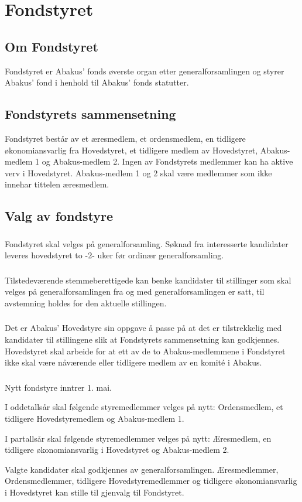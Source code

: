 \section{Fondstyret}
\subsection{Om Fondstyret}
Fondstyret er Abakus’ fonds øverste organ etter generalforsamlingen og styrer
Abakus’ fond i henhold til Abakus’ fonds statutter.

\subsection{Fondstyrets sammensetning}
Fondstyret består av et æresmedlem, et ordensmedlem, en tidligere økonomiansvarlig fra
Hovedstyret, et tidligere medlem av Hovedstyret, Abakus-medlem 1 og Abakus-medlem 2.
Ingen av Fondstyrets medlemmer kan ha aktive verv i Hovedstyret. Abakus-medlem 1 og 2 skal
være medlemmer som ikke innehar tittelen æresmedlem.

\subsection{Valg av fondstyre}
\subsubsection{}
Fondstyret skal velges på generalforsamling. Søknad fra interesserte kandidater
leveres hovedstyret to -2- uker før ordinær generalforsamling.

\subsubsection{}
Tilstedeværende stemmeberettigede kan benke kandidater til stillinger som skal velges
på generalforsamlingen fra og med generalforsamlingen er satt, til avstemning holdes for
den aktuelle stillingen.

\subsubsection{}
Det er Abakus’ Hovedstyre sin oppgave å passe på at det er tilstrekkelig med kandidater til
stillingene slik at Fondstyrets sammensetning kan godkjennes. Hovedstyret skal arbeide for
at ett av de to Abakus-medlemmene i Fondstyret ikke skal være nåværende eller tidligere
medlem av en komité i Abakus.

\subsubsection{}
Nytt fondstyre inntrer 1. mai.

I oddetallsår skal følgende styremedlemmer velges på nytt: Ordensmedlem, et tidligere
Hovedstyremedlem og Abakus-medlem 1.

I partallsår skal følgende styremedlemmer velges på nytt: Æresmedlem, en tidligere
økonomiansvarlig i Hovedstyret og Abakus-medlem 2.

Valgte kandidater skal godkjennes av generalforsamlingen. Æresmedlemmer, Ordensmedlemmer,
tidligere Hovedstyremedlemmer og tidligere økonomiansvarlig i Hovedstyret kan
stille til gjenvalg til Fondstyret.
